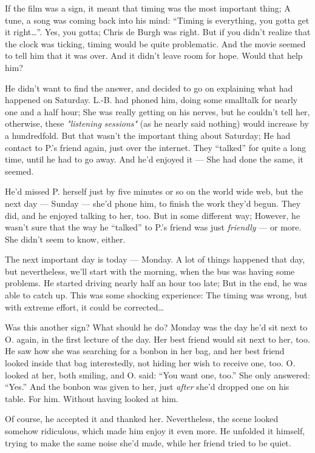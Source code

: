 If the film was a sign, it meant that timing was the most important thing; A tune, a song was coming back into his mind: \enquote{Timing is everything, you gotta get it right\dots{}}. Yes, you gotta; Chris de Burgh was right. 
But if you didn't realize that the clock was ticking, timing would be quite problematic. And the movie seemed to tell him that it was over. 
And it didn't leave room for hope. 
Would that help him?

He didn't want to find the answer, and decided to go on explaining what had happened on Saturday. L.-B. had phoned him, doing some smalltalk for nearly one and a half hour; She was really getting on his nerves, but he couldn't tell her, otherwise, these \emph{"listening sessions"} (as he nearly said nothing) would increase by a hundredfold. 
But that wasn't the important thing about Saturday; He had contact to P.'s friend again, just over the internet. They \enquote{talked} for quite a long time, until he had to go away. And he'd enjoyed it --- She had done the same, it seemed.

He'd missed P. herself just by five minutes or so on the world wide web, but the next day --- Sunday --- she'd phone him, to finish the work they'd begun. 
They did, and he enjoyed talking to her, too. But in some different way; However, he wasn't sure that the way he \enquote{talked} to P.'s friend was just \emph{friendly} --- or more. She didn't seem to know, either.

The next important day is today --- Monday. 
A lot of things happened that day, but nevertheless, we'll start with the morning, when the bus was having some problems. 
He started driving nearly half an hour too late; But in the end, he was able to catch up. This was some shocking experience: The timing was wrong, but with extreme effort, it could be corrected\dots{}

Was this another sign? What should he do?
Monday was the day he'd sit next to O. again, in the first lecture of the day. Her best friend would sit next to her, too. He saw how she was searching for a bonbon in her bag, and her best friend looked inside that bag interestedly, not hiding her wish to receive one, too. O. looked at her, both smiling, and O. said: \enquote{You want one, too.}
She only answered: \enquote{Yes.}
And the bonbon was given to her, just \emph{after} she'd dropped one on his table. 
For him. 
Without having looked at him.

Of course, he accepted it and thanked her. Nevertheless, the scene looked somehow ridiculous, which made him enjoy it even more. 
He unfolded it himself, trying to make the same noise she'd made, while her friend tried to be quiet.

